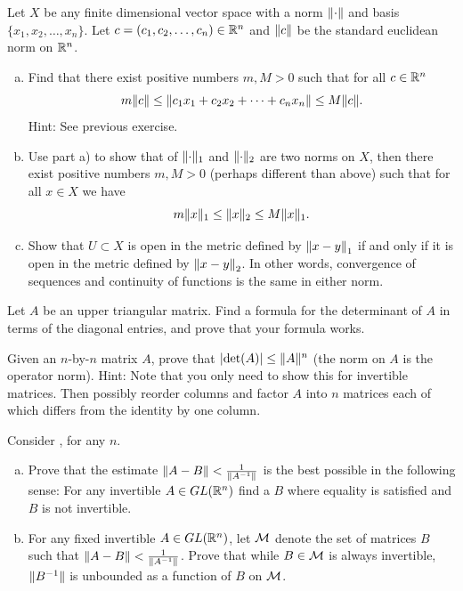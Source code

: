 \begin{exercise} \label{exercise:allnormsequiv}
Let $X$ be any finite dimensional vector space with a norm $\lVert {\cdot} \rVert$
and basis $\{ x_1,x_2,\ldots,x_n
\}$.  Let $c = (c_1,c_2,\ldots,c_n) \in {\mathbb{R}}^n$ and $\lVert {c} \rVert$ be the
standard euclidean norm on ${\mathbb{R}}^n$.
\begin{enumerate}[a)]
\item
Find that there exist positive numbers $m,M > 0$ such that
for all $c \in {\mathbb{R}}^n$
\begin{equation*}
m \lVert {c} \rVert
\leq
\lVert {c_1 x_1 + c_2 x_2 + \cdots + c_n x_n} \rVert
\leq
M \lVert {c} \rVert .
\end{equation*}
Hint: See previous exercise.
\item
Use part a) to show that of
$\lVert {\cdot} \rVert_1$ and
$\lVert {\cdot} \rVert_2$ are two norms on $X$, then there exist positive
numbers $m,M > 0$ (perhaps different than above) such that
for all $x \in X$ we have
\begin{equation*}
m \lVert {x} \rVert_1
\leq
\lVert {x} \rVert_2
\leq
M \lVert {x} \rVert_1 .
\end{equation*}
\item
Show that $U \subset X$ is open in the metric defined by
$\left\lVert {x-y} \right\rVert_1$ if and only if it is open in the metric defined by
$\left\lVert {x-y} \right\rVert_2$.  In other words, convergence of sequences and continuity
of functions is the same in either norm.
\end{enumerate}
\end{exercise}

\begin{exercise}
Let $A$ be an upper triangular matrix.  Find a formula for the determinant
of $A$ in terms of the diagonal entries, and prove that your formula works.
\end{exercise}

\begin{exercise}
Given an $n$-by-$n$ matrix $A$, prove that
$\left\lvert {\det(A)} \right\rvert \leq \lVert {A} \rVert^n$ (the norm on $A$ is the operator norm).
Hint: Note that you only need to show this for invertible matrices.  Then
possibly reorder columns and factor $A$ into $n$ matrices each of
which differs from the identity by one column.
\end{exercise}

\begin{exercise}
Consider , for any $n$.
\begin{enumerate}[a)]
\item
Prove that the estimate $\lVert {A-B} \rVert < \frac{1}{\lVert {A^{-1}} \rVert}$ is the
best possible in the following sense: For any invertible
$A \in GL({\mathbb{R}}^n)$ find a $B$ where equality is satisfied and $B$ is
not invertible.
\item
For any fixed invertible $A \in GL({\mathbb{R}}^n)$,
let ${\mathcal{M}}$ denote the set of matrices
$B$ such that
$\lVert {A-B} \rVert < \frac{1}{\lVert {A^{-1}} \rVert}$.
Prove that while $B \in {\mathcal{M}}$ is 
always invertible, $\lVert {B^{-1}} \rVert$ is unbounded
as a function of $B$ on ${\mathcal{M}}$.
\end{enumerate}
\end{exercise}

